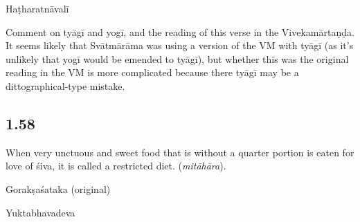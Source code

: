 \begin{ekdosis}
\begin{testimonia}[hp01_057]
Haṭharatnāvalī

\begin{versinnote}
\end{versinnote}

\end{testimonia}

\begin{philcomm}[hp01_057]
Comment on tyāgī and yogī, and the reading of this verse in the Vivekamārtaṇḍa. It seems likely that Svātmārāma was using a version of the VM with tyāgī (as it’s unlikely that yogī would be emended to tyāgī), but whether this was the original reading in the VM is more complicated because there tyāgī may be a dittographical-type mistake. 
\end{philcomm}

\subsection*{1.58}
\begin{translation}[hp01_058]
When very unctuous and sweet food that is without a quarter portion is eaten for love of śiva, it is called a restricted diet. (\emph{mitāhāra}).
\end{translation}

\begin{sources}[hp01_058]
Gorakṣaśataka (original)

\begin{versinnote}
\end{versinnote}

\end{sources}

\begin{testimonia}[hp01_058]
Yuktabhavadeva

\begin{versinnote}
\end{versinnote}


\end{testimonia}
\end{ekdosis}
